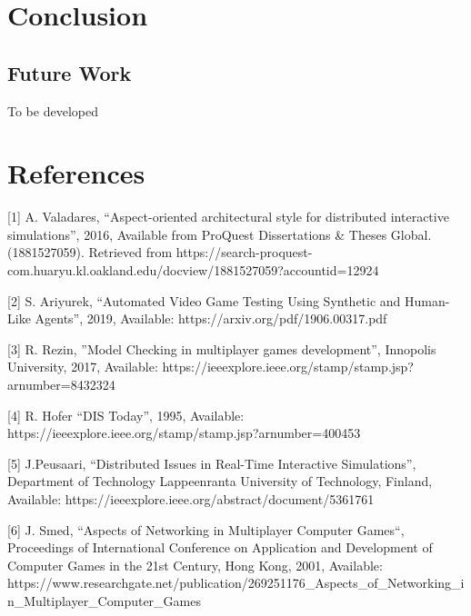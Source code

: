 \documentclass[conference]{IEEEtran}
\begin{document}
\section{Conclusion}
\subsection{Future Work}

To be developed

\section{References}
[1] A. Valadares, “Aspect-oriented architectural style for distributed interactive simulations”, 2016,
Available from ProQuest Dissertations \& Theses Global. (1881527059).
Retrieved from https://search-proquest-com.huaryu.kl.oakland.edu/docview/1881527059?accountid=12924

[2] S. Ariyurek, “Automated Video Game Testing Using
Synthetic and Human-Like Agents”, 2019, Available: https://arxiv.org/pdf/1906.00317.pdf

[3] R. Rezin, ”Model Checking in multiplayer games development”, Innopolis University,
2017, Available: https://ieeexplore.ieee.org/stamp/stamp.jsp?arnumber=8432324

[4] R. Hofer “DIS Today”, 1995, Available:
https://ieeexplore.ieee.org/stamp/stamp.jsp?arnumber=400453

[5] J.Peusaari, “Distributed Issues in Real-Time Interactive Simulations”, Department of Technology Lappeenranta University of Technology, Finland,
 Available: https://ieeexplore.ieee.org/abstract/document/5361761

[6] J. Smed, “Aspects of Networking in Multiplayer Computer Games“, Proceedings of International Conference on Application and Development of Computer Games in the 21st Century, Hong Kong, 2001,
Available: https://www.researchgate.net/publication/269251176\_Aspects\_of\_Networking\_in\_Multiplayer\_Computer\_Games
\end{document}
